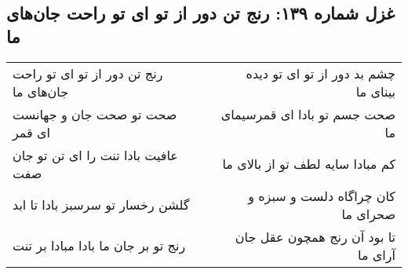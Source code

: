 \begin{center}
\section*{غزل شماره ۱۳۹: رنج تن دور از تو ای تو راحت جان‌های ما}
\label{sec:0139}
\begin{longtable}{l p{0.5cm} r}
رنج تن دور از تو ای تو راحت جان‌های ما
&&
چشم بد دور از تو ای تو دیده بینای ما
\\
صحت تو صحت جان و جهانست ای قمر
&&
صحت جسم تو بادا ای قمرسیمای ما
\\
عافیت بادا تنت را ای تن تو جان صفت
&&
کم مبادا سایه لطف تو از بالای ما
\\
گلشن رخسار تو سرسبز بادا تا ابد
&&
کان چراگاه دلست و سبزه و صحرای ما
\\
رنج تو بر جان ما بادا مبادا بر تنت
&&
تا بود آن رنج همچون عقل جان آرای ما
\\
\end{longtable}
\end{center}
